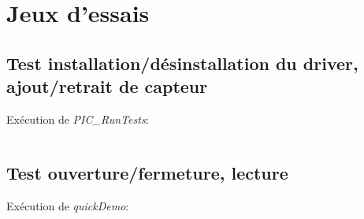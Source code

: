 
\section{Jeux d'essais}

\subsection{ Test installation/désinstallation du driver, ajout/retrait de capteur}
Exécution de \textsl{PIC\_RunTests}:

\inputminted[tabsize=4,linenos=true,fontsize=\footnotesize,frame=single,resetmargins=true]{console}{\SRCPATH/PIC_RunTests.trace}

\subsection{ Test ouverture/fermeture, lecture }
Exécution de \textsl{quickDemo}:

\inputminted[tabsize=4,linenos=true,fontsize=\footnotesize,frame=single,resetmargins=true]{console}{\SRCPATH/quickDemo.trace}
\vfill
\pagebreak
